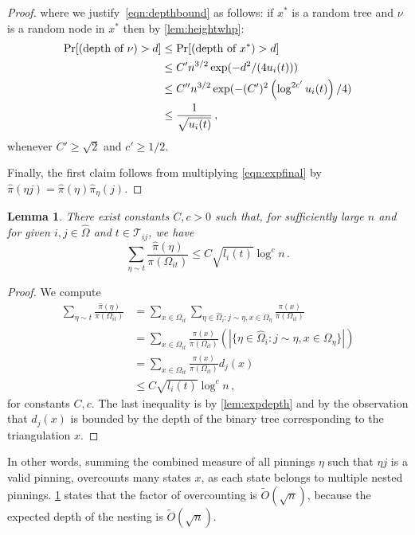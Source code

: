 \documentclass[a4paper, 12p]{article}
\numberwithin{equation}{section}
\newcommand{\Omorproj}{\hat{\Omega}}
\newcommand{\piorproj}{\hat{\pi}}
\newtheorem{lemma}[theorem]{Lemma}
\begin{document}
\begin{proof}
  
    where we justify~\eqref{eqn:depthbound} as follows: if $x^*$ is a random tree and $\nu$ is a random node in $x^*$ then by \cref{lem:heightwhp}: 
    \begin{align*}
        \Pr[(\textnormal{depth of }\nu) >d] &\leq \Pr[(\textnormal{depth of }x^*) > d] \\
        &\leq C' n^{3/2}\exp(-d^2/(4u_i(t))) \\
        &\leq C''n^{3/2}\exp(-(C')^2\left(\log^{2c'} u_i(t)\right) /4) \\
        &\leq \frac{1}{\sqrt {u_i(t)}} \,,
    \end{align*}
    whenever $C' \geq \sqrt 2$ and $c' \geq 1/2$. 
    
    Finally, the first claim follows from multiplying \eqref{eqn:expfinal} by $\piorproj(\eta j) = \piorproj(\eta)\piorproj_{\eta}(j)$.
\end{proof}

\begin{lemma}
    \label{lem:numeta}
    There exist constants $C, c > 0$ such that, for sufficiently large $n$ and for given $i,j \in \Omorproj$ and $t \in \mathcal{T}_{ij}$, we have 
    \[
        \sum_{ \eta \sim t} \frac{\piorproj(\eta)}{\pi(\Omega_{it})} \leq C\sqrt {l_i(t)}\log^c n\,.
    \]
\end{lemma}
\begin{proof}

    We compute
    \begin{align*}
          \sum_{\eta \sim t} \frac{\piorproj(\eta)}{\pi(\Omega_{it})} &= \sum_{x\in \Omega_{it}} \sum_{\eta \in \Omorproj_i: j\sim \eta, x \in \Omega_{\eta}}\frac{\pi(x)}{\pi(\Omega_{it})} \nonumber \\
          &= \sum_{x\in \Omega_{it}} \frac{\pi(x)}{\pi(\Omega_{it})}\left(|\{\eta \in \Omorproj_i: j \sim \eta, x \in \Omega_{\eta}\}|\right) \\
          &= \sum_{x \in \Omega_{it}}\frac{\pi(x)}{\pi(\Omega_{it})} d_j(x) \\
          &\leq C \sqrt{l_i(t)}\log^c n\,,
    \end{align*}
    for constants $C,c$.
    The last inequality is by \cref{lem:expdepth} and by the observation that $d_j(x)$ is bounded by the depth of the binary tree corresponding to the triangulation $x$.
\end{proof}

In other words, summing the combined measure of all pinnings $\eta$ such that $\eta j$ is a valid pinning, overcounts many states $x$, as each state belongs to multiple nested pinnings. \cref{lem:numeta} states that the factor of overcounting is $\widetilde O(\sqrt n)$, because the expected depth of the nesting is $\widetilde O(\sqrt n)$. 
\end{document}

